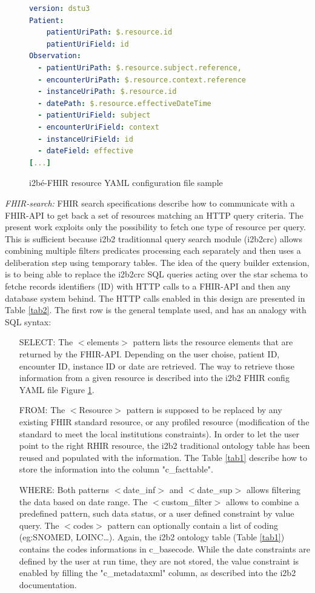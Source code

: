 \documentclass{amia}
\begin{document}
\begin{figure}
\begin{lstlisting}[language=yaml]
version: dstu3
Patient:
    patientUriPath: $.resource.id
    patientUriField: id
Observation:
  - patientUriPath: $.resource.subject.reference,
  - encounterUriPath: $.resource.context.reference
  - instanceUriPath: $.resource.id
  - datePath: $.resource.effectiveDateTime
  - patientUriField: subject
  - encounterUriField: context
  - instanceUriField: id
  - dateField: effective
[...]
\end{lstlisting}
  \caption{i2bé-FHIR resource YAML configuration file sample}
	\label{conf1}
\end{figure}
\textit{FHIR-search:} FHIR search specifications describe how to communicate with a FHIR-API to get back a set of resources matching an HTTP query criteria. The present work exploits only the possibility to fetch one type of resource per query. This is sufficient because i2b2 traditionnal query search module (i2b2crc) allows combining multiple filters predicates processing each separately and then uses a deliberation step using temporary tables. The idea of the query builder extension, is to being able to replace the i2b2crc SQL queries acting over the star schema to fetche records identifiers (ID) with HTTP calls to a FHIR-API and then any database system behind. The HTTP calls enabled in this design are presented in Table \ref{tab2}. The first row is the general template used, and has an analogy with SQL syntax:
\begin{itemize}
	\item[SELECT:] The $<$elements$>$ pattern lists the resource elements that are returned by the FHIR-API. Depending on the user choise, patient ID, encounter ID, instance ID or date are retrieved. The way to retrieve those information from a given resource is described into the i2b2 FHIR config YAML file Figure \ref{conf1}.
	\item[FROM:] The $<$Resource$>$ pattern is supposed to be replaced by any existing FHIR standard resource, or any profiled resource (modification of the standard to meet the local institutions constraints). In order to let the user point to the right RHIR resource, the i2b2 traditional ontology table has been reused and populated with the information. The Table \ref{tab1} describe how to store the information into the column "c\_facttable".
	\item [WHERE:] Both patterns $<$date\_inf$>$ and $<$date\_sup$>$ allows filtering the data based on date range. The $<$custom\_filter$>$ allows to combine a predefined pattern, such data status, or a user defined constraint by value query. The $<$codes$>$ pattern can optionally contain a list of coding (eg:SNOMED, LOINC\ldots). Again, the i2b2 ontology table (Table \ref{tab1}) contains the codes informations in c\_basecode. While the date constraints are defined by the user at run time, they are not stored, the value constraint is enabled by filling the "c\_metadataxml" column, as described into the i2b2 documentation.
\end{itemize}
\end{document}

